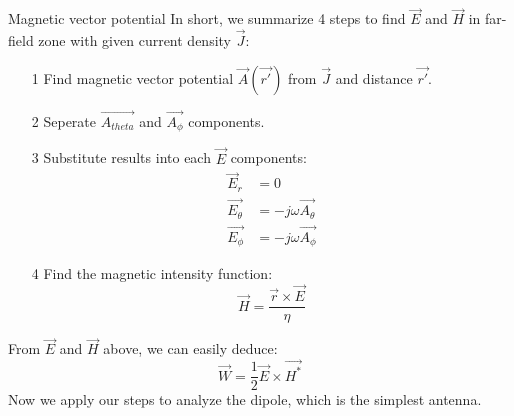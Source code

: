 \documentclass[8pt]{beamer}
\begin{document}
\begin{frame}{Magnetic vector potential}
In short, we summarize 4 steps to find $\vec{E}$ and $\vec{H}$ in far-field zone with given current density $\vec{J}$:
\begin{enumerate}
    \item[1] Find magnetic vector potential $\vec{A}(\vec{r'})$ from $\vec{J}$ and distance $\vec{r'}$.
    \item[2] Seperate $\vec{A_{theta}}$ and $\vec{A_{\phi}}$ components.
    \item[3] Substitute results into each $\vec{E}$ components:
    \begin{equation*}
        \begin{split}
            \vec{E}_{r}&=0\\
            \vec{E_{\theta}}&=-j\omega\vec{A_{\theta}}\\
            \vec{E_{\phi}}&=-j\omega\vec{A_{\phi}}
        \end{split}
    \end{equation*}
    \item[4] Find the magnetic intensity function: $$\vec{H}=\frac{\vec{r}\times\vec{E}}{\eta}$$
\end{enumerate}
From $\vec{E}$ and $\vec{H}$ above, we can easily deduce: $$\vec{W}=\frac{1}{2}\vec{E}\times\vec{H^*}$$
Now we apply our steps to analyze the dipole, which is the simplest antenna.
\end{frame}
\end{document}
